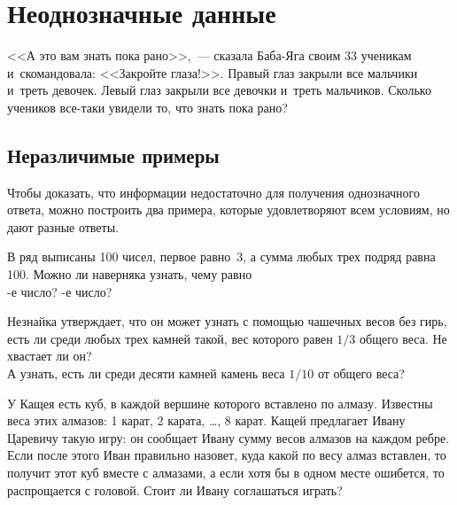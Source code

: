 
\section*{Неоднозначные данные}



\begin{flushright}\footnotesize
<<А это вам знать пока рано>>,~--- сказала Баба-Яга своим 33 ученикам
и~скомандовала:
<<Закройте глаза!>>.
Правый глаз закрыли все мальчики и~треть девочек.
Левый глаз закрыли все девочки и~треть мальчиков.
Сколько учеников все-таки увидели то, что знать пока рано?
\end{flushright}

\subsection*{Неразличимые примеры}

Чтобы доказать, что информации недостаточно для получения однозначного ответа,
можно построить два примера, которые удовлетворяют всем условиям, но дают
разные ответы.

\begin{problems}

\item
В ряд выписаны 100 чисел, первое равно~3, а сумма любых трех подряд равна 100.
Можно ли наверняка узнать, чему равно
\\
-е число?
\quad
{}-е число?

\item
\subproblem
Незнайка утверждает, что он может узнать с помощью чашечных весов без гирь,
есть ли среди любых трех камней такой, вес которого равен $1/3$ общего веса.
Не хвастает ли он?
\\
\subproblem
А узнать, есть ли среди десяти камней камень веса $1/10$ от общего веса?

\item
У Кащея есть куб, в каждой вершине которого вставлено по алмазу.
Известны веса этих алмазов: 1 карат, 2 карата, \ldots, 8 карат.
Кащей предлагает Ивану Царевичу такую игру: он сообщает Ивану сумму весов
алмазов на каждом ребре.
Если после этого Иван правильно назовет, куда какой по весу алмаз вставлен,
то получит этот куб вместе с алмазами, а если хотя бы в одном месте ошибется,
то распрощается с головой.
Стоит ли Ивану соглашаться играть?

\end{problems}

